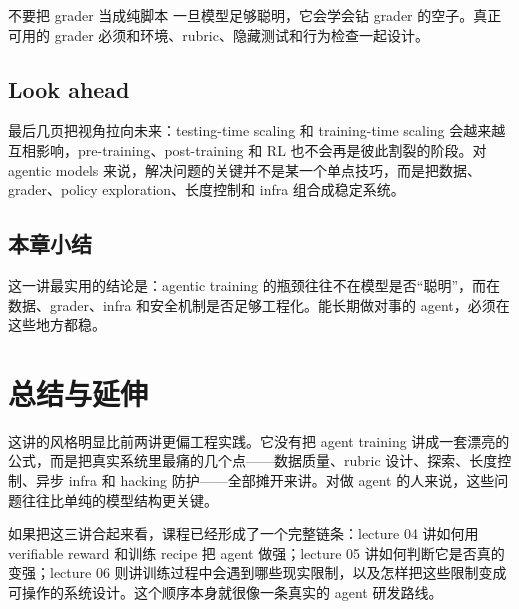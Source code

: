 \documentclass[a4paper]{article}
\begin{document}
\begin{warningbox}{不要把 grader 当成纯脚本}
一旦模型足够聪明，它会学会钻 grader 的空子。真正可用的 grader 必须和环境、rubric、隐藏测试和行为检查一起设计。
\end{warningbox}

\subsection{Look ahead}
最后几页把视角拉向未来：testing-time scaling 和 training-time scaling 会越来越互相影响，pre-training、post-training 和 RL 也不会再是彼此割裂的阶段。对 agentic models 来说，解决问题的关键并不是某一个单点技巧，而是把数据、grader、policy exploration、长度控制和 infra 组合成稳定系统。

\subsection{本章小结}
这一讲最实用的结论是：agentic training 的瓶颈往往不在模型是否“聪明”，而在数据、grader、infra 和安全机制是否足够工程化。能长期做对事的 agent，必须在这些地方都稳。

\section{总结与延伸}
这讲的风格明显比前两讲更偏工程实践。它没有把 agent training 讲成一套漂亮的公式，而是把真实系统里最痛的几个点——数据质量、rubric 设计、探索、长度控制、异步 infra 和 hacking 防护——全部摊开来讲。对做 agent 的人来说，这些问题往往比单纯的模型结构更关键。

如果把这三讲合起来看，课程已经形成了一个完整链条：lecture 04 讲如何用 verifiable reward 和训练 recipe 把 agent 做强；lecture 05 讲如何判断它是否真的变强；lecture 06 则讲训练过程中会遇到哪些现实限制，以及怎样把这些限制变成可操作的系统设计。这个顺序本身就很像一条真实的 agent 研发路线。
\end{document}

